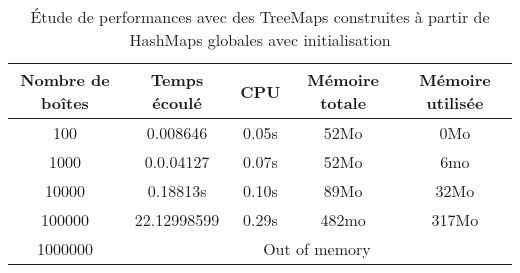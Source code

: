\begin{table}[h]
  \centering
\begin{tabular}{|c|c|c|c|c|}
\hline
Nombre de boîtes & Temps écoulé & CPU & Mémoire totale & Mémoire utilisée\\
\hline
100 & 0.008646 & 0.05s & 52Mo & 0Mo\\
\hline
1000 & 0.0.04127 & 0.07s & 52Mo & 6mo\\
\hline
10000 & 0.18813s & 0.10s & 89Mo & 32Mo\\
\hline
100000 & 22.12998599 & 0.29s & 482mo & 317Mo\\
\hline
1000000 & \multicolumn{4}{|c|}{Out of memory}\\
\hline
\end{tabular}
\caption{Étude de performances avec des TreeMaps construites à partir de HashMaps globales avec initialisation} 
\label{tab:treehashmapglobalInit}
\end{table}
